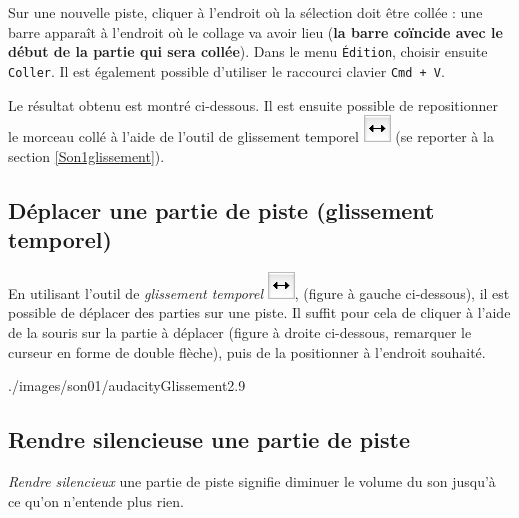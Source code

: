 Sur une nouvelle piste, cliquer à l'endroit où la sélection doit être collée : une barre apparaît à l'endroit où le collage va avoir lieu (\textbf{la barre coïncide avec le début de la partie qui sera collée}). Dans le menu \texttt{Édition}, choisir ensuite \texttt{Coller}. Il est également possible d'utiliser le raccourci clavier \texttt{Cmd + V}.  


Le résultat obtenu est montré ci-dessous. Il est ensuite possible de repositionner le morceau collé à l'aide de l'outil de glissement temporel \includegraphics[width=.5cm]{./images/son01/audacityIconeGlissement} (se reporter à la section \vref{Son1glissement}). 



\subsection{Déplacer une partie de piste (glissement temporel)}\label{Son1glissement} 

En utilisant l'outil de \emph{glissement temporel} \includegraphics[width=.5cm]{./images/son01/audacityIconeGlissement}, (figure à gauche ci-dessous), il est possible de déplacer des parties sur une piste. Il suffit pour cela de cliquer à l'aide de la souris sur la partie à déplacer (figure à droite ci-dessous, remarquer le curseur en forme de double flèche), puis de la positionner à l'endroit souhaité.

%
                {./images/son01/audacityGlissement2}{.9\textwidth}




\subsection{Rendre silencieuse une partie de piste}\label{Son1silence}

\emph{Rendre silencieux} une partie de piste signifie diminuer le volume du son jusqu'à ce qu'on n'entende plus rien.

